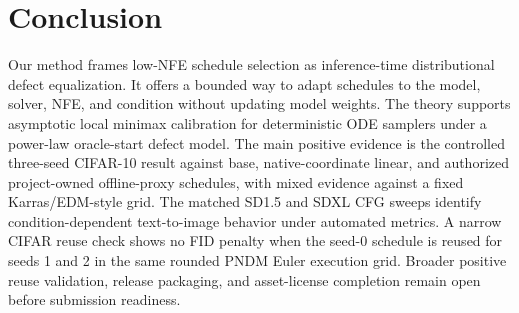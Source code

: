 \section{Conclusion}

Our method frames low-NFE schedule selection as inference-time distributional
defect equalization. It offers a bounded way to adapt schedules to the
model, solver, NFE, and condition without updating model weights. The theory
supports asymptotic local minimax calibration for deterministic ODE samplers
under a power-law oracle-start defect model. The main positive evidence is the
controlled three-seed CIFAR-10 result against base, native-coordinate linear,
and authorized project-owned offline-proxy schedules, with mixed evidence
against a fixed Karras/EDM-style grid. The matched SD1.5 and SDXL CFG sweeps
identify condition-dependent text-to-image behavior under automated metrics.
A narrow CIFAR reuse check shows no FID penalty when the seed-0 schedule is
reused for seeds 1 and 2 in the same rounded PNDM Euler execution grid. Broader
positive reuse validation, release packaging, and asset-license completion
remain open before submission readiness.

